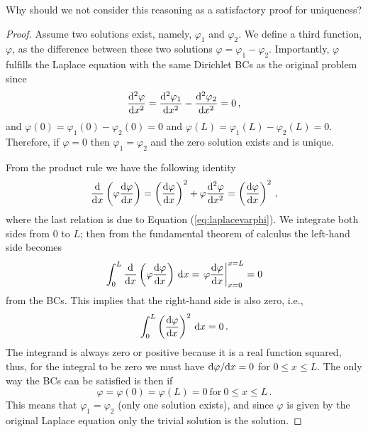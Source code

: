 \begin{question}
Why should we not consider this reasoning as a satisfactory proof for uniqueness?
\end{question}


\begin{proof}
	Assume two solutions exist, namely, $\varphi_1$ and $\varphi_2$. We 
	define a third function, $\varphi$,  as the difference between these two solutions 
	$\varphi = \varphi_1 - \varphi_2$. Importantly, $\varphi$ fulfills the Laplace 
	equation with the same Dirichlet BCs as the original problem since
	\begin{equation}
		\label{eq:laplacevarphi}
		 \frac{\mathrm{d}^2 \varphi}{\mathrm{d} x^2} =  \frac{\mathrm{d}^2 \varphi_1}{\mathrm{d} x^2} -  \frac{\mathrm{d}^2 \varphi_2}{\mathrm{d}
		 x^2} = 0  \, ,
	\end{equation}
	and $\varphi(0) = \varphi_1(0) - \varphi_2(0)=0$ and $\varphi(L)=\varphi_1(L) -
	\varphi_2(L)=0$. Therefore, if $\varphi = 0$ then $\varphi_1 = \varphi_2$ and the
	zero solution exists and is unique. 

	From the product rule we have the following identity
	\begin{equation}
    	\frac{\mathrm{d}}{\mathrm{d} x}\left(\varphi \frac{\mathrm{d} \varphi}{\mathrm{d} x} \right) = \left( \frac{\mathrm{d} \varphi}{\mathrm{d}
        	x}\right)^2 + \varphi \frac{\mathrm{d}^2 \varphi}{\mathrm{d} x^2} = \left( \frac{\mathrm{d} \varphi}{\mathrm{d} x}\right)^2 \, ,
  \end{equation}
  where the last relation is due to Equation (\ref{eq:laplacevarphi}). We integrate
	both sides from 0 to $L$; then from the fundamental theorem of calculus the left-hand side
	becomes 
  \begin{equation}
    \int_0^L \frac{\mathrm{d}}{\mathrm{d} x}\left(\varphi \frac{\mathrm{d} \varphi}{\mathrm{d} x} \right) \, \mathrm{d} x  =
    \left.  \varphi \frac{\mathrm{d}  \varphi}{\mathrm{d} x} \right|_{x=0}^{x=L} = 0 
  \end{equation}
  from the BCs. This implies that the right-hand side is also zero, i.e.,
  \begin{equation}
	  \int_0^L \left( \frac{\mathrm{d}  \varphi} {\mathrm{d} x}\right)^2 \, \mathrm{d} x = 0  \, .
  \end{equation}
  The integrand is always zero or positive because it is a real function squared, 
	thus, for the integral to be zero we
  must have $\mathrm{d}  \varphi /\mathrm{d} x = 0$ for $0 \leq x \leq L$. The only way the BCs can be
  satisfied is then if
  \begin{equation}
     \varphi  = \varphi(0)= \varphi(L)=0 \ \text{for}  \ 0 \leq x \leq L \, . 
  \end{equation}
	This means that $\varphi_1=\varphi_2$ (only one solution exists), 
	and since $\varphi$ is given by the original Laplace equation only 
	the trivial solution is the solution.
\end{proof}

